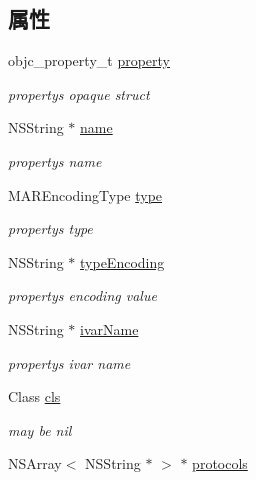 \subsection*{属性}
\begin{DoxyCompactItemize}
\item 
objc\+\_\+property\+\_\+t \hyperlink{interface_m_a_r_class_property_info_a30d9f591e6d05f5432f1f24654296111}{property}
\begin{DoxyCompactList}\small\item\em property\textquotesingle{}s opaque struct \end{DoxyCompactList}\item 
N\+S\+String $\ast$ \hyperlink{interface_m_a_r_class_property_info_aedc5c86476921ce285141b3ac6de04c5}{name}
\begin{DoxyCompactList}\small\item\em property\textquotesingle{}s name \end{DoxyCompactList}\item 
M\+A\+R\+Encoding\+Type \hyperlink{interface_m_a_r_class_property_info_a6959f16236a3ba5fb5f912c8df5b5055}{type}
\begin{DoxyCompactList}\small\item\em property\textquotesingle{}s type \end{DoxyCompactList}\item 
N\+S\+String $\ast$ \hyperlink{interface_m_a_r_class_property_info_a2cc7316bac321439ca369e2fb44cc9f3}{type\+Encoding}
\begin{DoxyCompactList}\small\item\em property\textquotesingle{}s encoding value \end{DoxyCompactList}\item 
N\+S\+String $\ast$ \hyperlink{interface_m_a_r_class_property_info_ac14b2b00995190177a9a4962d04269ab}{ivar\+Name}
\begin{DoxyCompactList}\small\item\em property\textquotesingle{}s ivar name \end{DoxyCompactList}\item 
Class \hyperlink{interface_m_a_r_class_property_info_a703b535aa974de24490e5699968663a6}{cls}
\begin{DoxyCompactList}\small\item\em may be nil \end{DoxyCompactList}\item 
N\+S\+Array$<$ N\+S\+String $\ast$ $>$ $\ast$ \hyperlink{interface_m_a_r_class_property_info_a8ab085cd93eaa1973920faaf27a4311c}{protocols}

\end{DoxyCompactItemize}
